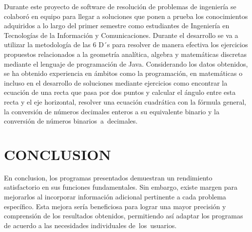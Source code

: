 \documentclass{IEEEcsmag}
\begin{document}
\maketitle
\chapteri Durante este proyecto de software de resolución de problemas de ingeniería se colaboró en equipo para llegar a soluciones que ponen a prueba los conocimientos adquiridos a lo largo del primer semestre como estudiantes de Ingeniería en Tecnologías de la Información y Comunicaciones. Durante el desarrollo se va a utilizar la metodología de las 6 D´s para resolver de manera efectiva los ejercicios propuestos relacionados a la geometría analítica, algebra y matemáticas discretas mediante el lenguaje de programación de Java. Considerando los datos obtenidos, se ha obtenido experiencia en ámbitos como la programación, en matemáticas o incluso en el desarrollo de soluciones mediante ejercicios como encontrar la ecuación de una recta que pasa por dos puntos y calcular el ángulo entre esta recta y el eje horizontal, resolver una ecuación cuadrática con la fórmula general, la conversión de números decimales enteros a su equivalente binario y la conversión de números binarios a decimales.
\clearpage


\clearpage


\clearpage


\clearpage


\clearpage


\clearpage


\clearpage


\section{CONCLUSION}
En conclusion, los programas presentados demuestran un rendimiento satisfactorio en sus funciones fundamentales. Sin embargo, existe margen para mejorarlos al incorporar información adicional pertinente a cada problema específico. Esta mejora sería beneficiosa para lograr una mayor precisión y comprensión de los resultados obtenidos, permitiendo así adaptar los programas de acuerdo a las necesidades individuales de los usuarios.
\vspace*{-8pt}
\end{document}
